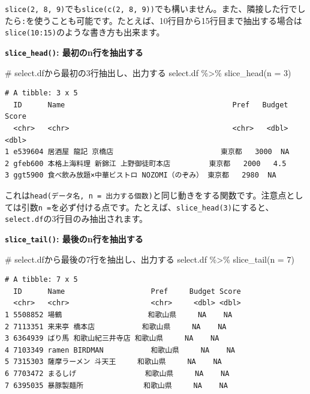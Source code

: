 \documentclass[
  a4paper,
  pandoc,
  ja=standard,
  jafont=haranoaji]{bxjsbook}
\newenvironment{Shaded}{\begin{snugshade}}{\end{snugshade}}
\newcommand{\AttributeTok}[1]{\textcolor[rgb]{0.00,0.48,0.65}{#1}}
\newcommand{\CommentTok}[1]{\textcolor[rgb]{0.37,0.37,0.37}{#1}}
\newcommand{\DecValTok}[1]{\textcolor[rgb]{0.68,0.00,0.00}{#1}}
\newcommand{\FunctionTok}[1]{\textcolor[rgb]{0.28,0.35,0.67}{#1}}
\newcommand{\NormalTok}[1]{\textcolor[rgb]{0.00,0.48,0.65}{#1}}
\newcommand{\SpecialCharTok}[1]{\textcolor[rgb]{0.37,0.37,0.37}{#1}}
\begin{document}
\texttt{slice(2,\ 8,\ 9)}でも\texttt{slice(c(2,\ 8,\ 9))}でも構いません。また、隣接した行でしたら\texttt{:}を使うことも可能です。たとえば、10行目から15行目まで抽出する場合は\texttt{slice(10:15)}のような書き方も出来ます。

\textbf{\texttt{slice\_head()}: 最初のn行を抽出する}

\begin{Shaded}
\begin{Highlighting}[numbers=left,,]
\CommentTok{\# select.dfから最初の3行抽出し、出力する}
\NormalTok{select.df }\SpecialCharTok{\%\textgreater{}\%} 
  \FunctionTok{slice\_head}\NormalTok{(}\AttributeTok{n =} \DecValTok{3}\NormalTok{)}
\end{Highlighting}
\end{Shaded}

\begin{verbatim}
# A tibble: 3 x 5
  ID      Name                                       Pref   Budget Score
  <chr>   <chr>                                      <chr>   <dbl> <dbl>
1 e539604 居酒屋 龍記 京橋店                         東京都   3000  NA  
2 gfeb600 本格上海料理 新錦江 上野御徒町本店         東京都   2000   4.5
3 ggt5900 食べ飲み放題×中華ビストロ NOZOMI（のぞみ） 東京都   2980  NA  
\end{verbatim}

これは\texttt{head(データ名,\ n\ =\ 出力する個数)}と同じ動きをする関数です。注意点としては引数\texttt{n\ =}を必ず付ける点です。たとえば、\texttt{slice\_head(3)}にすると、\texttt{select.df}の3行目のみ抽出されます。

\textbf{\texttt{slice\_tail()}: 最後のn行を抽出する}

\begin{Shaded}
\begin{Highlighting}[numbers=left,,]
\CommentTok{\# select.dfから最後の7行を抽出し、出力する}
\NormalTok{select.df }\SpecialCharTok{\%\textgreater{}\%} 
  \FunctionTok{slice\_tail}\NormalTok{(}\AttributeTok{n =} \DecValTok{7}\NormalTok{)}
\end{Highlighting}
\end{Shaded}

\begin{verbatim}
# A tibble: 7 x 5
  ID      Name                    Pref     Budget Score
  <chr>   <chr>                   <chr>     <dbl> <dbl>
1 5508852 場鶴                    和歌山県     NA    NA
2 7113351 来来亭 橋本店           和歌山県     NA    NA
3 6364939 ばり馬 和歌山紀三井寺店 和歌山県     NA    NA
4 7103349 ramen BIRDMAN           和歌山県     NA    NA
5 7315303 薩摩ラーメン 斗天王     和歌山県     NA    NA
6 7703472 まるしげ                和歌山県     NA    NA
7 6395035 暴豚製麺所              和歌山県     NA    NA
\end{verbatim}
\end{document}
